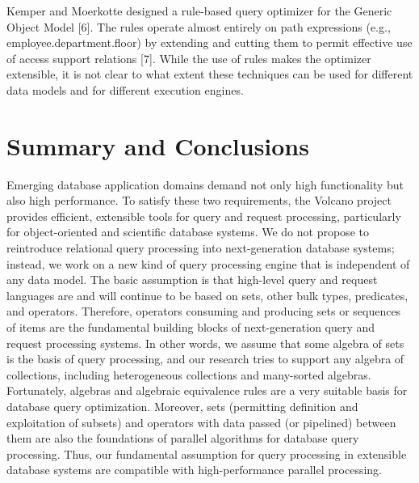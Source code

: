 \documentclass[a4paper,12pt,notitlepage,twoside,openright]{article}
\begin{document}
Kemper and Moerkotte designed a rule-based query optimizer for the
Generic Object Model {[}6{]}. The rules operate almost entirely on path
expressions (e.g., employee.department.floor) by extending and cutting
them to permit effective use of access support relations [7]. While
the use of rules makes the optimizer extensible, it is not clear to what
extent these techniques can be used for different data models and for
different execution engines.

\hypertarget{summary-and-conclusions}{%
\section{Summary and Conclusions}\label{summary-and-conclusions}}

Emerging database application domains demand not only high functionality
but also high performance. To satisfy these two requirements, the
Volcano project provides efficient, extensible tools for query and
request processing, particularly for object-oriented and scientific
database systems. We do not propose to reintroduce relational query
processing into next-generation database systems; instead, we work on a
new kind of query processing engine that is independent of any data
model. The basic assumption is that high-level query and request
languages are and will continue to be based on sets, other bulk types,
predicates, and operators. Therefore, operators consuming and producing
sets or sequences of items are the fundamental building blocks of
next-generation query and request processing systems. In other words, we
assume that some algebra of sets is the basis of query processing, and
our research tries to support any algebra of collections, including
heterogeneous collections and many-sorted algebras. Fortunately,
algebras and algebraic equivalence rules are a very suitable basis for
database query optimization. Moreover, sets (permitting definition and
exploitation of subsets) and operators with data passed (or pipelined)
between them are also the foundations of parallel algorithms for
database query processing. Thus, our fundamental assumption for query
processing in extensible database systems are compatible with
high-performance parallel processing.
\end{document}
